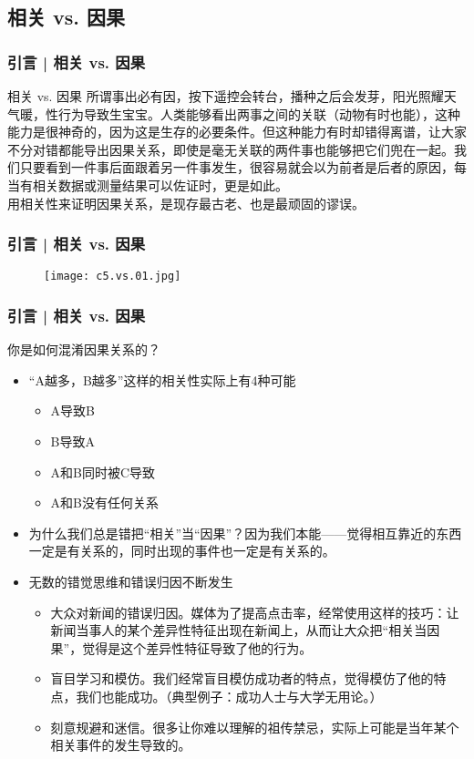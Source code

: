 \subsection{相关 vs. 因果}
\begin{frame}
  \frametitle{引言 | 相关 vs. 因果}
  \begin{block}{相关 vs. 因果}
所谓事出必有因，按下遥控会转台，播种之后会发芽，阳光照耀天气暖，性行为导致生宝宝。人类能够看出两事之间的关联（动物有时也能），这种能力是很神奇的，因为这是生存的必要条件。但这种能力有时却错得离谱，让大家不分对错都能导出因果关系，即使是毫无关联的两件事也能够把它们兜在一起。我们只要看到一件事后面跟着另一件事发生，很容易就会以为前者是后者的原因，每当有相关数据或测量结果可以佐证时，更是如此。\\
    \vspace{0.5em}
    \alert{用相关性来证明因果关系，是现存最古老、也是最顽固的谬误。}
  \end{block}
\end{frame}

\begin{frame}
  \frametitle{引言 | 相关 vs. 因果}
  \begin{figure}
    \centering
    \texttt{[image: c5.vs.01.jpg]}
  \end{figure}
\end{frame}

\begin{frame}
  \frametitle{引言 | 相关 vs. 因果}
  \begin{block}{你是如何混淆因果关系的？}
    \begin{itemize}
      \item “A越多，B越多”这样的相关性实际上有4种可能
        \begin{itemize}
          \item A导致B
          \item B导致A
          \item A和B同时被C导致
          \item A和B没有任何关系
        \end{itemize}
      \item 为什么我们总是错把“相关”当“因果”？因为我们本能——觉得相互靠近的东西一定是有关系的，同时出现的事件也一定是有关系的。
      \item 无数的错觉思维和错误归因不断发生
        \begin{itemize}
          \item 大众对新闻的错误归因。媒体为了提高点击率，经常使用这样的技巧：让新闻当事人的某个差异性特征出现在新闻上，从而让大众把“相关当因果”，觉得是这个差异性特征导致了他的行为。
          \item 盲目学习和模仿。我们经常盲目模仿成功者的特点，觉得模仿了他的特点，我们也能成功。（典型例子：成功人士与大学无用论。）
          \item 刻意规避和迷信。很多让你难以理解的祖传禁忌，实际上可能是当年某个相关事件的发生导致的。
        \end{itemize}
    \end{itemize}
  \end{block}
\end{frame}


